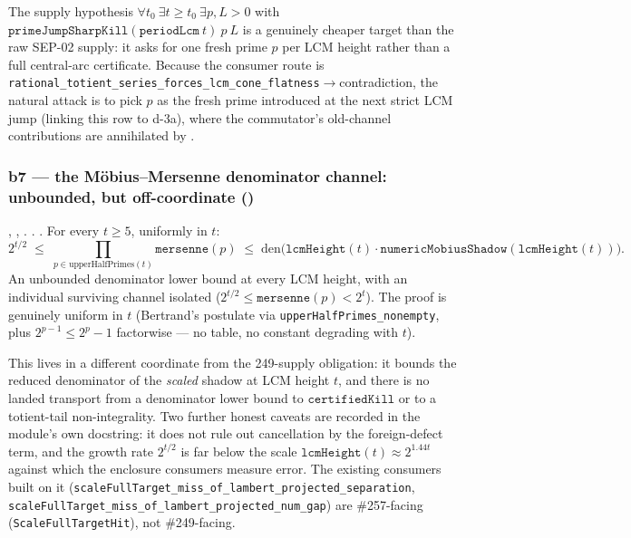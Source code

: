 \begin{rem}
The supply hypothesis $\forall t_0\ \exists t\ge t_0\ \exists p,L{>}0$ with
$\mathtt{primeJumpSharpKill}(\mathtt{periodLcm}\ t)\ p\ L$ is a genuinely cheaper target than the
raw SEP-02 supply: it asks for one fresh prime $p$ per LCM height rather than a full central-arc
certificate. Because the consumer route is
\nolinkurl{rational_totient_series_forces_lcm_cone_flatness}$\to$contradiction, the natural
attack is to pick $p$ as the fresh prime introduced at the next strict LCM jump (linking this row
to d-3a), where the commutator's old-channel contributions are annihilated by
.
\end{rem}

\subsubsection{b7 --- the M\"obius--Mersenne denominator channel: unbounded, but off-coordinate ()}

\begin{thm}
,
,
.
. . For every $t\ge 5$, uniformly in $t$:
\[
  2^{t/2} \;\le\; \prod_{p\in \mathrm{upperHalfPrimes}(t)} \mathtt{mersenne}(p) \;\le\;
  \mathrm{den}\bigl(\mathtt{lcmHeight}(t)\cdot \mathtt{numericMobiusShadow}(\mathtt{lcmHeight}(t))\bigr).
\]
An unbounded denominator lower bound at every LCM height, with an individual surviving channel
isolated ($2^{t/2}\le \mathtt{mersenne}(p) < 2^t$). The proof is genuinely uniform in $t$
(Bertrand's postulate via \texttt{upperHalfPrimes\_nonempty}, plus $2^{p-1}\le 2^p{-}1$ factorwise
--- no table, no constant degrading with $t$).
\end{thm}

\begin{rem}
This lives in a different coordinate from the 249-supply obligation: it bounds the reduced
denominator of the \emph{scaled} shadow at LCM height $t$, and there is no landed transport from a
denominator lower bound to $\mathtt{certifiedKill}$ or to a totient-tail non-integrality. Two
further honest caveats are recorded in the module's own docstring: it does not rule out
cancellation by the foreign-defect term, and the growth rate $2^{t/2}$ is far below the scale
$\mathtt{lcmHeight}(t)\approx 2^{1.44t}$ against which the enclosure consumers measure error. The
existing consumers built on it
(\texttt{scaleFullTarget\_miss\_of\_lambert\_projected\_separation},
\texttt{scaleFullTarget\_miss\_of\_lambert\_projected\_num\_gap}) are \#257-facing
(\texttt{ScaleFullTargetHit}), not \#249-facing.
\end{rem}


